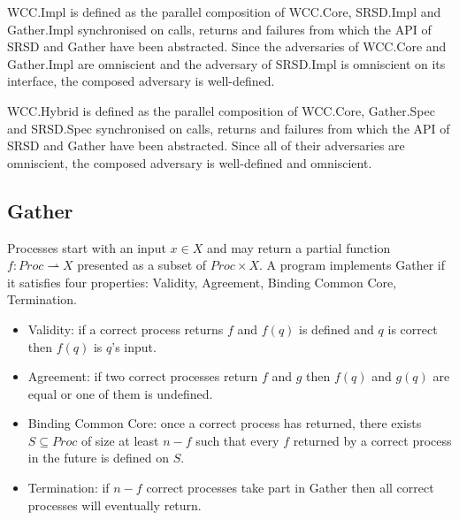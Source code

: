 \begin{definition}
    \label{WCC:Impl}

    \textsf{WCC.Impl} is defined as the parallel composition of
    \textsf{WCC.Core}, \textsf{SRSD.Impl} and \textsf{Gather.Impl}
    synchronised on calls, returns and failures from which the
    API of \textsf{SRSD} and \textsf{Gather} have been abstracted. Since the adversaries of
    \textsf{WCC.Core} and \textsf{Gather.Impl} are omniscient and the adversary
    of \textsf{SRSD.Impl} is omniscient on its interface, the composed adversary
    is well-defined.
\end{definition}

\begin{definition}
    \label{WCC:Hybrid}

    \textsf{WCC.Hybrid} is defined as the parallel composition of
    \textsf{WCC.Core}, \textsf{Gather.Spec} and \textsf{SRSD.Spec}
    synchronised on calls, returns and failures from which the
    API of \textsf{SRSD} and \textsf{Gather} have been abstracted. Since all of their adversaries
    are omniscient, the composed adversary is well-defined and omniscient.
\end{definition}

\subsection{\textsf{Gather}}

Processes start with an input $x \in X$ and may return a partial function
$f: Proc \rightharpoonup X$ presented as a subset of $Proc \times X$.
A program implements \textsf{Gather} if it satisfies four properties: Validity, Agreement, Binding
Common Core, Termination.
\begin{itemize}
    \item Validity: if a correct process returns $f$ and $f(q)$ is defined and $q$ is correct then
    $f(q)$ is $q$'s input.
    \item Agreement: if two correct processes return $f$ and $g$ then $f(q)$ and $g(q)$ are equal
    or one of them is undefined.
    \item Binding Common Core: once a correct process has returned, there exists
    $S \subseteq Proc$ of size at least $n-f$ such that every $f$ returned by a correct process in
    the future is defined on $S$.
    \item Termination: if $n-f$ correct processes take part in \textsf{Gather} then all correct
    processes will eventually return.
\end{itemize}

